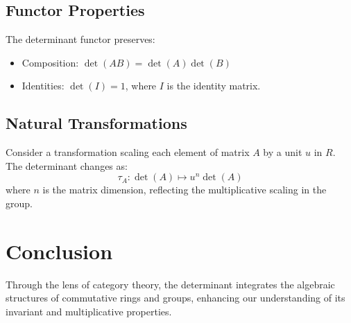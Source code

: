\subsection{Functor Properties}
The determinant functor preserves:
\begin{itemize}
	\item Composition: \(\det(AB) = \det(A)\det(B)\)
	\item Identities: \(\det(I) = 1\), where \(I\) is the identity matrix.
\end{itemize}

\subsection{Natural Transformations}
Consider a transformation scaling each element of matrix \(A\) by a unit \(u\) in \(R\). The determinant changes as:
\[ \tau_A: \det(A) \mapsto u^n \det(A) \]
where \(n\) is the matrix dimension, reflecting the multiplicative scaling in the group.

\section{Conclusion}
Through the lens of category theory, the determinant integrates the algebraic structures of commutative rings and groups, enhancing our understanding of its invariant and multiplicative properties.
